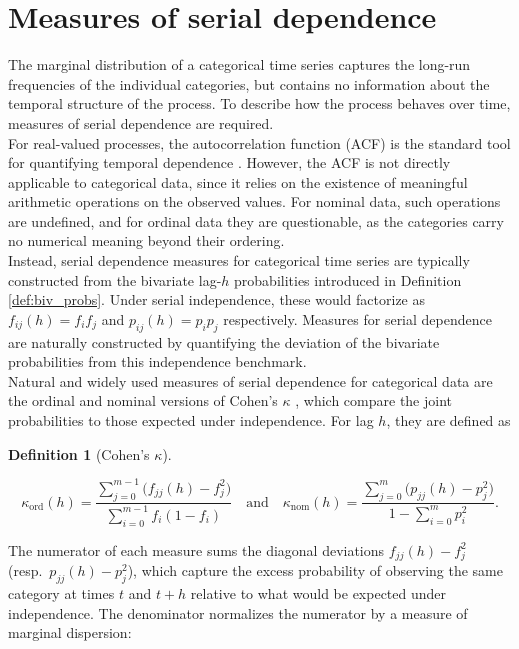 ﻿\documentclass[12pt,a4paper]{scrreprt}
\theoremstyle{definition}
\newtheorem{definition}[theorem]{Definition}
\begin{document}
\section{Measures of serial dependence}

The marginal distribution of a categorical time series captures the long-run 
frequencies of the individual categories, but contains no information about the 
temporal structure of the process. To describe how the process behaves over time, 
measures of serial dependence are required.\\
For real-valued processes, the autocorrelation function (ACF) is the standard 
tool for quantifying temporal dependence \citep[see Section 1.4]{brockwell_davis_2016}. However, the ACF is not directly applicable 
to categorical data, since it relies on the existence of meaningful arithmetic 
operations on the observed values. For nominal data, such operations are undefined, 
and for ordinal data they are questionable, as the categories carry no numerical meaning beyond their ordering.\\
Instead, serial dependence measures for categorical time series are typically constructed 
from the bivariate lag-$h$ probabilities introduced in Definition \ref{def:biv_probs}. 
Under serial independence, these would factorize as $f_{ij}(h) = f_if_j$ and 
$p_{ij}(h) = p_ip_j$ respectively. Measures for serial dependence are naturally 
constructed by quantifying the deviation of the bivariate probabilities from this 
independence benchmark.\\
Natural and widely used measures of serial dependence for categorical data are the ordinal 
and nominal versions of Cohen's $\kappa$ \citep[p. 130]{Weiss2018}, which compare the joint 
probabilities to those expected under independence. For lag $h$, they 
are defined as
\begin{definition}[Cohen's $\kappa$]
\label{def:cohens-kappa}

\[
    \kappa_{\mathrm{ord}}(h) 
    = \frac{\sum_{j=0}^{m-1}\bigl(f_{jj}(h) - f_j^2\bigr)}
           {\sum_{i=0}^{m-1} f_i(1-f_i)}
    \quad \text{and} \quad
    \kappa_{\mathrm{nom}}(h) 
    = \frac{\sum_{j=0}^{m}\bigl(p_{jj}(h) - p_j^2\bigr)}
           {1-\sum_{i=0}^{m} p_i^2}.
\]
\end{definition}
\noindent The numerator of each measure sums the diagonal deviations $f_{jj}(h) - f_j^2$
(resp.\ $p_{jj}(h) - p_j^2$), which capture the excess probability of observing
the same category at times $t$ and $t+h$ relative to what would be expected under
independence. The denominator normalizes the numerator by a measure of marginal dispersion:
\end{document}
